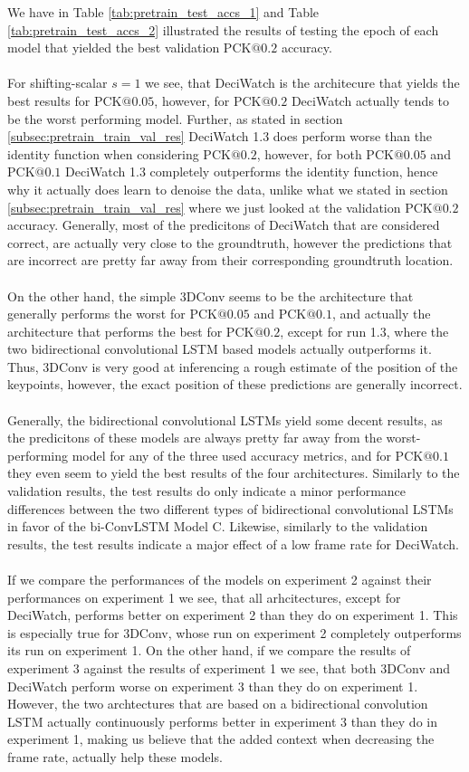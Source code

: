 \documentclass[./main.tex]{subfiles}
\begin{document}
\noindent We have in Table \ref{tab:pretrain_test_accs_1} and Table \ref{tab:pretrain_test_accs_2} illustrated the results of testing the epoch of each model that yielded the best validation PCK$@0.2$ accuracy.
\\
\\
For shifting-scalar $s = 1$ we see, that DeciWatch is the architecure that yields the best results for PCK$@0.05$, however, for PCK$@0.2$ DeciWatch actually tends to be the worst performing model. Further, as stated in section \ref{subsec:pretrain_train_val_res} DeciWatch 1.3 does perform worse than the identity function when considering PCK$@0.2$, however, for both PCK$@0.05$ and PCK$@0.1$ DeciWatch 1.3 completely outperforms the identity function, hence why it actually does learn to denoise the data, unlike what we stated in section \ref{subsec:pretrain_train_val_res} where we just looked at the validation PCK$@0.2$ accuracy. Generally, most of the predicitons of DeciWatch that are considered correct, are actually very close to the groundtruth, however the predictions that are incorrect are pretty far away from their corresponding groundtruth location.
\\
\\
On the other hand, the simple 3DConv seems to be the architecture that generally performs the worst for PCK$@0.05$ and PCK$@0.1$, and actually the architecture that performs the best for PCK$@0.2$, except for run 1.3, where the two bidirectional convolutional LSTM based models actually outperforms it. Thus, 3DConv is very good at inferencing a rough estimate of the position of the keypoints, however, the exact position of these predictions are generally incorrect.
\\
\\
Generally, the bidirectional convolutional LSTMs yield some decent results, as the predicitons of these models are always pretty far away from the worst-performing model for any of the three used accuracy metrics, and for PCK$@0.1$ they even seem to yield the best results of the four architectures. Similarly to the validation results, the test results do only indicate a minor performance differences between the two different types of bidirectional convolutional LSTMs in favor of the bi-ConvLSTM Model C. Likewise, similarly to the validation results, the test results indicate a major effect of a low frame rate for DeciWatch. 
\\
\\
If we compare the performances of the models on experiment 2 against their performances on experiment 1 we see, that all arhcitectures, except for DeciWatch, performs better on experiment 2 than they do on experiment 1. This is especially true for 3DConv, whose run on experiment 2 completely outperforms its run on experiment 1. On the other hand, if we compare the results of experiment 3 against the results of experiment 1 we see, that both 3DConv and DeciWatch perform worse on experiment 3 than they do on experiment 1. However, the two archtectures that are based on a bidirectional convolution LSTM actually continuously performs better in experiment 3 than they do in experiment 1, making us believe that the added context when decreasing the frame rate, actually help these models.
\end{document}
